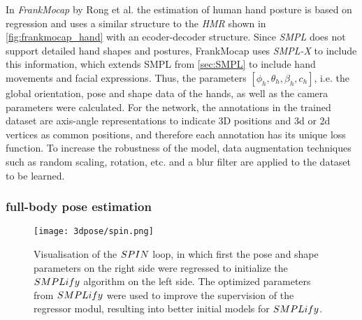 In \emph{FrankMocap} by Rong et al. \cite{frankmocap} the estimation of human hand posture is based on regression and uses a similar structure to the \emph{HMR} shown in \autoref{fig:frankmocap_hand} with an ecoder-decoder structure. Since \emph{SMPL} does not support detailed hand shapes and postures, FrankMocap uses \emph{SMPL-X} to include this information, which extends SMPL from \autoref{sec:SMPL} to include hand movements and facial expressions. Thus, the parameters $[\phi_{h},\theta_{h},\beta_{h},c_{h}]$, i.e. the global orientation, pose and shape data of the hands, as well as the camera parameters were calculated. For the network, the annotations in the trained dataset are axis-angle representations to indicate 3D positions and 3d or 2d vertices as common positions, and therefore each annotation has its unique loss function. To increase the robustness of the model, data augmentation techniques such as random scaling, rotation, etc. and a blur filter are applied to the dataset to be learned.

\subsubsection{full-body pose estimation}
\begin{figure}[h]
	\centering
	\texttt{[image: 3dpose/spin.png]}
	\caption{Visualisation of the $\protect SPIN$ loop, in which first the pose and shape parameters on the right side were regressed to initialize the $\protect SMPLify$ algorithm on the left side. The optimized parameters from $\protect SMPLify$ were used to improve the supervision of the regressor modul, resulting into better initial models for $\protect SMPLify$. \cite{spin}}
	\label{fig:spin}
\end{figure}

